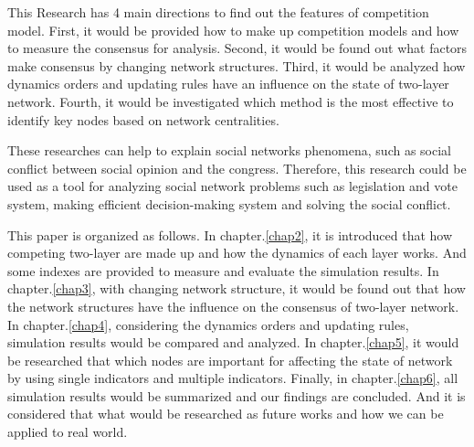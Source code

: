 This Research has 4 main directions to find out the features of competition model. First, it would be provided how to make up competition models and how to measure the consensus for analysis. Second, it would be found out what factors make consensus by changing network structures. Third, it would be analyzed how dynamics orders and updating rules have an influence on the state of two-layer network. Fourth, it would be investigated which method is the most effective to identify key nodes based on network centralities.

These researches can help to explain social networks phenomena, such as social conflict between social opinion and the congress. Therefore, this research could be used as a tool for analyzing social network problems such as legislation and vote system, making efficient decision-making system and solving the social conflict.

This paper is organized as follows. In chapter.\ref{chap2}, it is introduced that how competing two-layer are made up and how the dynamics of each layer works. And some indexes are provided to measure and evaluate the simulation results. In chapter.\ref{chap3}, with changing network structure, it would be found out that how the network structures have the influence on the consensus of two-layer network. In chapter.\ref{chap4}, considering the dynamics orders and updating rules, simulation results would be compared and analyzed. In chapter.\ref{chap5}, it would be researched that which nodes are important for affecting the state of network by using single indicators and multiple indicators. Finally, in chapter.\ref{chap6}, all simulation results would be summarized and our findings are concluded. And it is considered that what would be researched as future works and how we can be applied to real world. 



